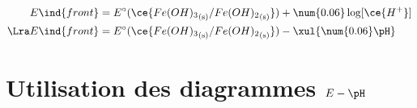 \documentclass[../../main/main.tex]{subfiles}
\begin{document}
\begin{tcb*}[breakable]
\begin{enumerate}[label=\sqenumi]
\begin{itemize}
{				      \begin{align*}
					      E\ind{front} & =
					      E^\circ(\ce{{Fe(OH)_3}_{\rm(s)}/{Fe(OH)_2}_{\rm(s)}}) + \num{0.06}
					      \log [\ce{H^+}]
					      \\\Lra
					      E\ind{front} & =
					      E^\circ(\ce{{Fe(OH)_3}_{\rm(s)}/{Fe(OH)_2}_{\rm(s)}}) - \xul{\num{0.06}\pH}
				      \end{align*}
			      }%
			      \vspace{-15pt}
		\end{itemize}
	\end{enumerate}
	\begin{center}
	\end{center}
\end{tcb*}

\section{Utilisation des diagrammes $E-\pH$}
\label{sec:util}
\end{document}
